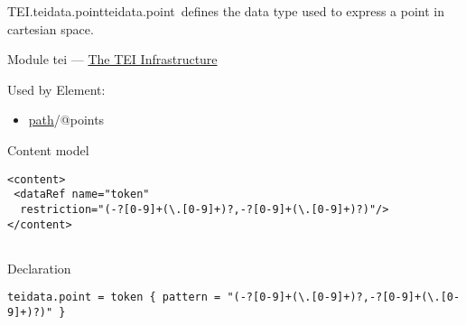 \begin{reflist}
\item[]\begin{specHead}{TEI.teidata.point}{teidata.point} defines the data type used to express a point in cartesian space.\end{specHead} 
    \item[{Module}]
  tei — \hyperref[ST]{The TEI Infrastructure}
    \item[{Used by}]
  Element: \begin{itemize}
\item \hyperref[TEI.path]{path}/@points
\end{itemize} 
    \item[{Content model}]
  \mbox{}\hfill\\[-10pt]\begin{Verbatim}[fontsize=\small]
<content>
 <dataRef name="token"
  restriction="(-?[0-9]+(\.[0-9]+)?,-?[0-9]+(\.[0-9]+)?)"/>
</content>
    
\end{Verbatim}

    \item[{Declaration}]
  \mbox{}\hfill\\[-10pt]\begin{Verbatim}[fontsize=\small]
teidata.point = token { pattern = "(-?[0-9]+(\.[0-9]+)?,-?[0-9]+(\.[0-9]+)?)" }
\end{Verbatim}


\end{reflist}
